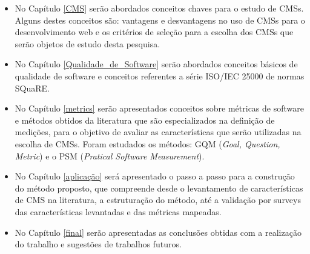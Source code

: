 \begin{itemize}


\item No Capítulo \ref{CMS} serão abordados conceitos chaves para o estudo de CMSs. Alguns destes conceitos são: vantagens e desvantagens no uso de CMSs para o desenvolvimento web e os critérios de seleção para a escolha dos CMSs que serão objetos de estudo desta pesquisa.
 
\item No Capítulo \ref{Qualidade_de_Software} serão abordados conceitos básicos de qualidade de software e conceitos referentes a série ISO/IEC 25000 de normas SQuaRE.  

\item No Capítulo \ref{metrics} serão apresentados conceitos sobre métricas de software e métodos obtidos da literatura que são especializados na definição de medições, para o objetivo de avaliar as características que serão utilizadas na escolha de CMSs. Foram estudados os métodos: GQM (\textit{Goal, Question, Metric}) e o PSM (\textit{Pratical Software Measurement}).

\item No Capítulo \ref{aplicação} será apresentado o passo a passo para a construção do método proposto, que compreende desde o levantamento de características de CMS na literatura, a estruturação do método, até a validação por surveys das características levantadas e das métricas mapeadas.

\item No Capítulo \ref{final}  serão apresentadas as conclusões obtidas com a realização do trabalho e sugestões de trabalhos futuros.  
%
\end{itemize}
